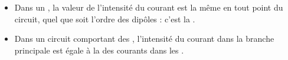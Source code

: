 \documentclass[12pt,a4paper]{article}
\begin{document}
\begin{mybilan}
	\begin{itemize}
		\item Dans un , la valeur de l'intensité du courant est la même en tout point du circuit, quel que soit l'ordre des dipôles : c'est la .
			
			
		
	
		\item Dans un circuit comportant des , l'intensité du courant dans la branche principale est égale à la  des courants dans les .
		
		
		

\end{itemize}
\end{mybilan}
\end{document}
